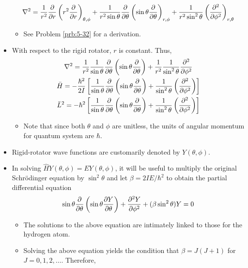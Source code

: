 \documentclass[../notes.tex]{subfiles}
\begin{document}
\begin{itemize}
    \begin{equation*}
        \nabla^2 = \frac{1}{r^2}\pdv{r}\left( r^2\pdv{r} \right)_{\theta,\phi}+\frac{1}{r^2\sin\theta}\pdv{\theta}\left( \sin\theta\pdv{\theta} \right)_{r,\phi}+\frac{1}{r^2\sin^2\theta}\left( \pdv[2]{\phi} \right)_{r,\theta}
    \end{equation*}
    \begin{itemize}
        \item See Problem \ref{prb:5-32} for a derivation.
    \end{itemize}
    \item With respect to the rigid rotator, $r$ is constant. Thus,
    \begin{gather*}
        \nabla^2 = \frac{1}{r^2}\frac{1}{\sin\theta}\pdv{\theta}\left( \sin\theta\pdv{\theta} \right)+\frac{1}{r^2}\frac{1}{\sin^2\theta}\pdv[2]{\phi}\\
        \bar{H} = -\frac{\hbar^2}{2I}\left[ \frac{1}{\sin\theta}\pdv{\theta}\left( \sin\theta\pdv{\theta} \right)+\frac{1}{\sin^2\theta}\left( \pdv[2]{\phi} \right) \right]\\
        \bar{L}^2 = -\hbar^2\left[ \frac{1}{\sin\theta}\pdv{\theta}\left( \sin\theta\pdv{\theta} \right)+\frac{1}{\sin^2\theta}\left( \pdv[2]{\phi} \right) \right]
    \end{gather*}
    \begin{itemize}
        \item Note that since both $\theta$ and $\phi$ are unitless, the units of angular momentum for quantum system are $\hbar$.
    \end{itemize}
    \item Rigid-rotator wave functions are customarily denoted by $Y(\theta,\phi)$.
    \item In solving $\hat{H}Y(\theta,\phi)=EY(\theta,\phi)$, it will be useful to multiply the original Schr\"{o}dinger equation by $\sin^2\theta$ and let $\beta=2IE/\hbar^2$ to obtain the partial differential equation
    \begin{equation*}
        \sin\theta\pdv{\theta}\left( \sin\theta\pdv{Y}{\theta} \right)+\pdv[2]{Y}{\phi}+(\beta\sin^2\theta)Y = 0
    \end{equation*}
    \begin{itemize}
        \item The solutions to the above equation are intimately linked to those for the hydrogen atom.
        \item Solving the above equation yields the condition that $\beta=J(J+1)$ for $J=0,1,2,\dots$. Therefore,

\end{itemize}
\end{itemize}
\end{document}
